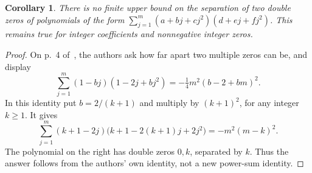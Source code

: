 \documentclass[11pt]{article}
\newtheorem{corollary}[theorem]{Corollary}
\begin{document}
\begin{corollary}\label{cor:distance}
There is no finite upper bound on the separation of two double zeros of
polynomials of the form
$\sum_{j=1}^m(a+bj+cj^2)(d+ej+fj^2)$.
This remains true for integer coefficients and nonnegative integer zeros.
\end{corollary}
\begin{proof}
On p.~4 of~\cite{KS}, the authors ask how far apart two multiple zeros
can be, and display
\[
 \sum_{j=1}^m(1-bj)(1-2j+bj^2)=-\tfrac14m^2(b-2+bm)^2.
\]
In this identity put $b=2/(k+1)$ and multiply by $(k+1)^2$, for any
integer $k\ge1$. It gives
\[
 \sum_{j=1}^m(k+1-2j)\bigl(k+1-2(k+1)j+2j^2\bigr)
       =-m^2(m-k)^2.
\]
The polynomial on the right has double zeros $0,k$, separated by $k$.
Thus the answer follows from the authors' own identity, not a new
power-sum identity.
\end{proof}
\end{document}
